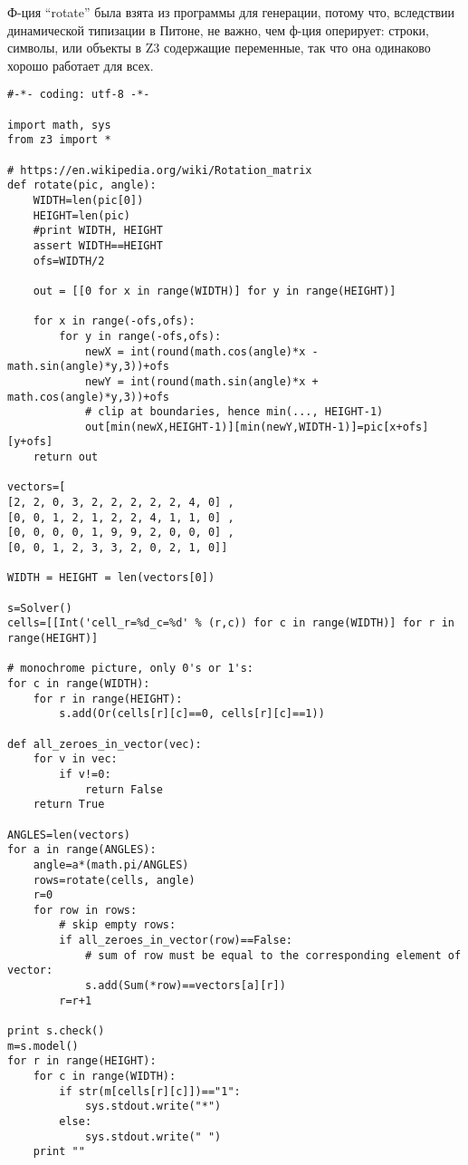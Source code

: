 Ф-ция ``rotate'' была взята из программы для генерации, потому что, вследствии динамической типизации в Питоне,
не важно, чем ф-ция оперирует: строки, символы, или объекты в Z3 содержащие переменные, так что она одинаково хорошо
работает  для всех.

\begin{lstlisting}
#-*- coding: utf-8 -*-

import math, sys
from z3 import *

# https://en.wikipedia.org/wiki/Rotation_matrix
def rotate(pic, angle):
    WIDTH=len(pic[0])
    HEIGHT=len(pic)
    #print WIDTH, HEIGHT
    assert WIDTH==HEIGHT
    ofs=WIDTH/2

    out = [[0 for x in range(WIDTH)] for y in range(HEIGHT)]

    for x in range(-ofs,ofs):
        for y in range(-ofs,ofs):
            newX = int(round(math.cos(angle)*x - math.sin(angle)*y,3))+ofs
            newY = int(round(math.sin(angle)*x + math.cos(angle)*y,3))+ofs
            # clip at boundaries, hence min(..., HEIGHT-1)
            out[min(newX,HEIGHT-1)][min(newY,WIDTH-1)]=pic[x+ofs][y+ofs]
    return out

vectors=[
[2, 2, 0, 3, 2, 2, 2, 2, 2, 4, 0] ,
[0, 0, 1, 2, 1, 2, 2, 4, 1, 1, 0] ,
[0, 0, 0, 0, 1, 9, 9, 2, 0, 0, 0] ,
[0, 0, 1, 2, 3, 3, 2, 0, 2, 1, 0]]

WIDTH = HEIGHT = len(vectors[0])

s=Solver()
cells=[[Int('cell_r=%d_c=%d' % (r,c)) for c in range(WIDTH)] for r in range(HEIGHT)]

# monochrome picture, only 0's or 1's:
for c in range(WIDTH):
    for r in range(HEIGHT):
        s.add(Or(cells[r][c]==0, cells[r][c]==1))

def all_zeroes_in_vector(vec):
    for v in vec:
        if v!=0:
            return False
    return True

ANGLES=len(vectors)
for a in range(ANGLES):
    angle=a*(math.pi/ANGLES)
    rows=rotate(cells, angle)
    r=0
    for row in rows:
        # skip empty rows:
        if all_zeroes_in_vector(row)==False:
            # sum of row must be equal to the corresponding element of vector:
            s.add(Sum(*row)==vectors[a][r])
        r=r+1

print s.check()
m=s.model()
for r in range(HEIGHT):
    for c in range(WIDTH):
        if str(m[cells[r][c]])=="1":
            sys.stdout.write("*")
        else:
            sys.stdout.write(" ")
    print ""
\end{lstlisting}

